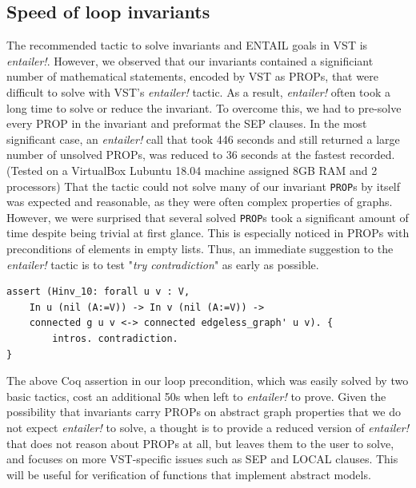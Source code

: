 \subsection{Speed of loop invariants}
The recommended tactic to solve invariants and ENTAIL goals in VST is \textit{entailer!}. However, we observed that our invariants contained a significiant number of mathematical statements, encoded by VST as PROPs, that were difficult to solve with VST's \textit{entailer!} tactic. As a result, \textit{entailer!} often took a long time to solve or reduce the invariant. To overcome this, we had to pre-solve every PROP in the invariant and preformat the SEP clauses. In the most significant case, an \textit{entailer!} call that took 446 seconds and still returned a large number of unsolved PROPs, was reduced to 36 seconds at the fastest recorded. (Tested on a VirtualBox Lubuntu 18.04 machine assigned 8GB RAM and 2 processors)
\newline\newline
That the tactic could not solve many of our invariant \texttt{PROP}s by itself was expected and reasonable, as they were often complex properties of graphs. However, we were surprised that several solved \texttt{PROP}s took a significant amount of time despite being trivial at first glance. This is especially noticed in PROPs with preconditions of elements in empty lists. Thus, an immediate suggestion to the \textit{entailer!} tactic is to test "\textit{try contradiction}" as early as possible.
\begin{lstlisting}
assert (Hinv_10: forall u v : V,
	In u (nil (A:=V)) -> In v (nil (A:=V)) ->
	connected g u v <-> connected edgeless_graph' u v). {
		intros. contradiction.
}
\end{lstlisting}
The above Coq assertion in our loop precondition, which was easily solved by two basic tactics, cost an additional 50s when left to \textit{entailer!} to prove.
\newline\newline
Given the possibility that invariants carry PROPs on abstract graph properties that we do not expect \textit{entailer!} to solve, a thought is to provide a reduced version of \textit{entailer!} that does not reason about PROPs at all, but leaves them to the user to solve, and focuses on more VST-specific issues such as SEP and LOCAL clauses. This will be useful for verification of functions that implement abstract models.
